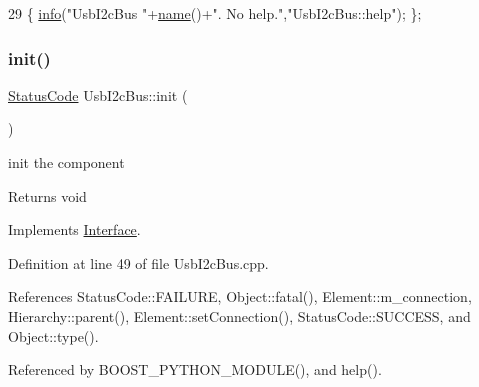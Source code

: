 \begin{DoxyCode}
29 \{ \hyperlink{classObject_a644fd329ea4cb85f54fa6846484b84a8}{info}(\textcolor{stringliteral}{"UsbI2cBus "}+\hyperlink{classObject_a300f4c05dd468c7bb8b3c968868443c1}{name}()+\textcolor{stringliteral}{". No help."},\textcolor{stringliteral}{"UsbI2cBus::help"}); \};
\end{DoxyCode}
\mbox{\label{classUsbI2cBus_a595c6e7f618e4f8c6b45e2dcf0fbdabb}} 
\subsubsection{\texorpdfstring{init()}{init()}}
{\footnotesize\ttfamily \hyperlink{classStatusCode}{Status\+Code} Usb\+I2c\+Bus\+::init (\begin{DoxyParamCaption}{ }\end{DoxyParamCaption})\hspace{0.3cm}{\ttfamily [virtual]}}

init the component

\begin{DoxyReturn}{Returns}
void 
\end{DoxyReturn}


Implements \hyperlink{classInterface_a1d095c113b1e89d1f5f68323856fee63}{Interface}.



Definition at line 49 of file Usb\+I2c\+Bus.\+cpp.



References Status\+Code\+::\+F\+A\+I\+L\+U\+RE, Object\+::fatal(), Element\+::m\+\_\+connection, Hierarchy\+::parent(), Element\+::set\+Connection(), Status\+Code\+::\+S\+U\+C\+C\+E\+SS, and Object\+::type().



Referenced by B\+O\+O\+S\+T\+\_\+\+P\+Y\+T\+H\+O\+N\+\_\+\+M\+O\+D\+U\+L\+E(), and help().



